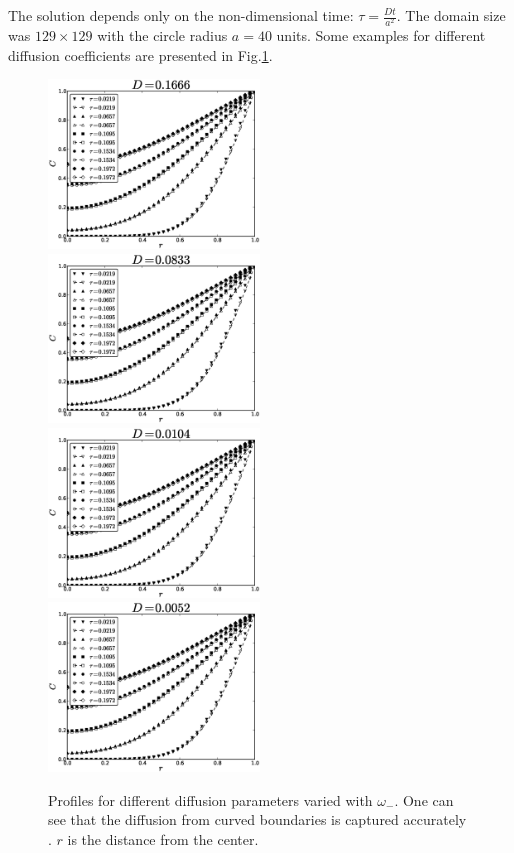 \documentclass{article}
\newcommand{\omegaminus}{\omega_{-}}
\begin{document}
The solution depends only on the non-dimensional time: $\tau=\frac{D t}{a^2}$. The domain size was $129\times 129$ with the circle radius $a=40$ units. Some examples for
different diffusion coefficients are presented in Fig.\ref{fig:cylinder:benchmark}.
\begin{figure}[htb!]
\includegraphics[width=0.5\textwidth]{Figures/cylinder1666.eps}
\includegraphics[width=0.5\textwidth]{Figures/cylinder0833.eps}\\
\includegraphics[width=0.5\textwidth]{Figures/cylinder0104.eps}
\includegraphics[width=0.5\textwidth]{Figures/cylinder0052.eps}\\
\caption{Profiles for different diffusion parameters varied with $\omegaminus$. One can see that the
diffusion from curved boundaries is captured
accurately \label{fig:cylinder:benchmark}. $r$ is the distance from the center.}
\end{figure}
\end{document}
